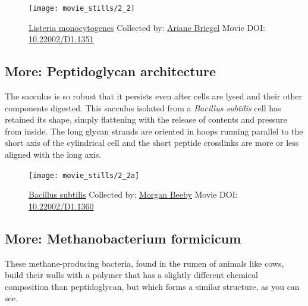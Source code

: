 \documentclass[]{tufte-book}
\begin{document}
\begin{figure}
\texttt{[image: movie\_stills/2\_2]} \caption[\protect\hyperlink{tree}{Listeria monocytogenes} Collected by:
\protect\hyperlink{ariane_briegel}{Ariane Briegel} Movie DOI:
\href{https://doi.org/10.22002/D1.1351}{10.22002/D1.1351}]{\protect\hyperlink{tree}{Listeria monocytogenes} Collected by:
\protect\hyperlink{ariane_briegel}{Ariane Briegel} Movie DOI:
\href{https://doi.org/10.22002/D1.1351}{10.22002/D1.1351}}\label{fig:2-2}
\end{figure}

\hypertarget{Peptidoglycan_architecture}{\subsection*{More:
Peptidoglycan architecture}\label{Peptidoglycan_architecture}}

The sacculus is so robust that it persists even after cells are lysed
and their other components digested. This sacculus isolated from a
\emph{Bacillus subtilis} cell has retained its shape, simply flattening
with the release of contents and pressure from inside. The long glycan
strands are oriented in hoops running parallel to the short axis of the
cylindrical cell and the short peptide crosslinks are more or less
aligned with the long axis.





\begin{figure}
\texttt{[image: movie\_stills/2\_2a]} \caption[\protect\hyperlink{tree}{Bacillus subtilis} Collected by:
\protect\hyperlink{morgan_beeby}{Morgan Beeby} Movie DOI:
\href{https://doi.org/10.22002/D1.1360}{10.22002/D1.1360}]{\protect\hyperlink{tree}{Bacillus subtilis} Collected by:
\protect\hyperlink{morgan_beeby}{Morgan Beeby} Movie DOI:
\href{https://doi.org/10.22002/D1.1360}{10.22002/D1.1360}}\label{fig:2-2a}
\end{figure}

\hypertarget{Methanobacterium_formicicum}{\subsection*{More:
Methanobacterium formicicum}\label{Methanobacterium_formicicum}}

These methane-producing bacteria, found in the rumen of animals like
cows, build their walls with a polymer that has a slightly different
chemical composition than peptidoglycan, but which forms a similar
structure, as you can see.
\end{document}
